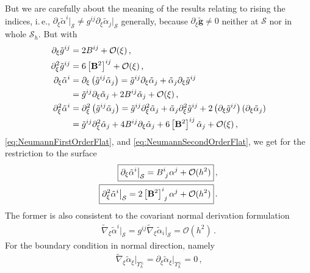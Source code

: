 \documentclass[a4paper,10pt]{scrartcl}
\newcommand{\surf}{\mathcal{S}}
\newcommand{\surfh}{\surf_{h}}
\newcommand{\landau}{\mathcal{O}}
\newcommand{\gb}{\mathbf{g}}
\newcommand{\tgb}{\tilde{\gb}}
\newcommand{\tg}{\tilde{g}}
\newcommand{\Bb}{\mathbf{B}}
\newcommand{\talpha}{\tilde{\alpha}}
\newcommand{\tnabla}{\tilde{\nabla}}
\newcommand{\boundary}[1]{\Upsilon_{h}^{#1}}
\newcommand{\AtBoundary}[1]{\big|_{\boundary{#1}}}
\newcommand{\AtSurface}{\big|_{\surf}}
\newcommand{\formComma}{\,\text{,}}
\newcommand{\formPeriod}{\,\text{.}}
\newcommand{\ie}{i.\,e.}%
\begin{document}
    But we are carefully about the meaning of the results relating to rising the indices,
    \ie, \( \partial_{\xi}\talpha^{i}\AtSurface \neq g^{ij}\partial_{\xi}\talpha_{j}\AtSurface  \) generally,
    because \(\partial_{\xi}\tgb \neq 0  \) neither at \( \surf \) nor in whole \( \surfh \).
    But with
    \begin{align}
      \partial_{\xi}\tg^{ij} &= 2B^{ij} + \landau(\xi) \formComma\\
      \partial_{\xi}^{2}\tg^{ij} &= 6\left[ \Bb^{2} \right]^{ij} + \landau(\xi) \formComma\\
      \partial_{\xi}\talpha^{i} &= \partial_{\xi}\left(\tg^{ij}\talpha_{j}\right)  \label{eq:dnuCoToContra}
                                = \tg^{ij}\partial_{\xi}\talpha_{j} + \talpha_{j}\partial_{\xi}\tg^{ij} \\\notag
                                &= \tg^{ij}\partial_{\xi}\talpha_{j} + 2B^{ij}\talpha_{j} + \landau(\xi) \formComma  \\
      \partial_{\xi}^{2}\talpha^{i} &= \partial_{\xi}^{2}\left(\tg^{ij}\talpha_{j}\right) \label{eq:dnudnuCoToContra}
                                = \tg^{ij}\partial_{\xi}^{2}\talpha_{j} + \talpha_{j}\partial_{\xi}^{2}\tg^{ij} 
                                      + 2\left( \partial_{\xi}\tg^{ij} \right)\left( \partial_{\xi}\talpha_{j}\right)\\\notag
                               &= \tg^{ij}\partial_{\xi}^{2}\talpha_{j} + 4B^{ij}\partial_{\xi}\talpha_{j} + 6\left[ \Bb^{2} \right]^{ij}\talpha_{j}  + \landau(\xi) \formComma
    \end{align}
    \eqref{eq:NeumannFirstOrderFlat}, and \eqref{eq:NeumannSecondOrderFlat}, we get for the restriction to the surface
    \begin{align}
      \boxed{\partial_{\xi}\talpha^{i}\AtSurface = \tensor{B}{^{i}_{j}}\alpha^{j} + \landau(h^{2})} \formComma\\
      \boxed{\partial_{\xi}^{2}\talpha^{i}\AtSurface = 2 \tensor{\left[ \Bb^{2} \right]}{^{i}_{j}}\alpha^{j} + \landau(h^{2})} \formPeriod
    \end{align}
    The former is also consistent to the covariant normal derivation formulation
    \begin{align}
      \boxed{\tnabla_{\xi}\talpha^{i}\AtSurface = g^{ij}\tnabla_{\xi}\talpha_{i}\AtSurface = \landau(h^{2})} \formPeriod
    \end{align}
    For the boundary condition in normal direction, namely
    \begin{align}
      \tnabla_{\xi}\talpha_{\xi}\AtBoundary{\pm} =  \partial_{\xi} \talpha_{\xi}\AtBoundary{\pm} = 0 \formComma
    \end{align}
\end{document}
